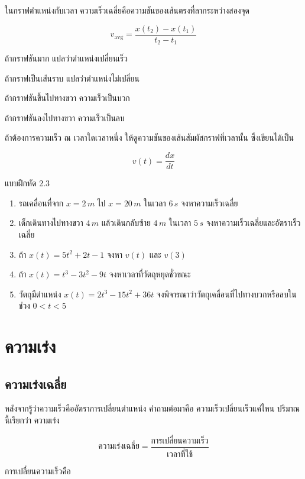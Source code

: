ในกราฟตำแหน่งกับเวลา ความเร็วเฉลี่ยคือความชันของเส้นตรงที่ลากระหว่างสองจุด

\[
v_{\text{avg}}=\frac{x(t_2)-x(t_1)}{t_2-t_1}
\]

ถ้ากราฟชันมาก แปลว่าตำแหน่งเปลี่ยนเร็ว

ถ้ากราฟเป็นเส้นราบ แปลว่าตำแหน่งไม่เปลี่ยน

ถ้ากราฟชันขึ้นไปทางขวา ความเร็วเป็นบวก

ถ้ากราฟชันลงไปทางขวา ความเร็วเป็นลบ

\begin{tcolorbox}[title=เชื่อมกับแคลคูลัส]
ถ้าต้องการความเร็ว ณ เวลาใดเวลาหนึ่ง ให้ดูความชันของเส้นสัมผัสกราฟที่เวลานั้น ซึ่งเขียนได้เป็น

\[
v(t)=\frac{dx}{dt}
\]
\end{tcolorbox}

\begin{exercisebox}{แบบฝึกหัด 2.3}
\begin{enumerate}
    \item รถเคลื่อนที่จาก $x=2\,\si{m}$ ไป $x=20\,\si{m}$ ในเวลา $6\,\si{s}$ จงหาความเร็วเฉลี่ย
    \item เด็กเดินทางไปทางขวา $4\,\si{m}$ แล้วเดินกลับซ้าย $4\,\si{m}$ ในเวลา $5\,\si{s}$ จงหาความเร็วเฉลี่ยและอัตราเร็วเฉลี่ย
    \item ถ้า $x(t)=5t^2+2t-1$ จงหา $v(t)$ และ $v(3)$
    \item ถ้า $x(t)=t^3-3t^2-9t$ จงหาเวลาที่วัตถุหยุดชั่วขณะ
    \item วัตถุมีตำแหน่ง $x(t)=2t^3-15t^2+36t$ จงพิจารณาว่าวัตถุเคลื่อนที่ไปทางบวกหรือลบในช่วง $0<t<5$
\end{enumerate}
\end{exercisebox}

\section{ความเร่ง}

\subsection{ความเร่งเฉลี่ย}

หลังจากรู้ว่าความเร็วคืออัตราการเปลี่ยนตำแหน่ง คำถามต่อมาคือ ความเร็วเปลี่ยนเร็วแค่ไหน ปริมาณนี้เรียกว่า ความเร่ง

\[
\text{ความเร่งเฉลี่ย}=\frac{\text{การเปลี่ยนความเร็ว}}{\text{เวลาที่ใช้}}
\]

การเปลี่ยนความเร็วคือ

